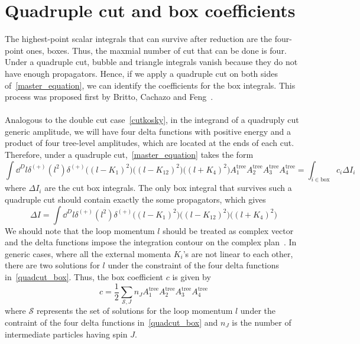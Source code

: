 \section{Quadruple cut and box coefficients}
The highest-point scalar integrals that can survive after reduction are the four-point ones, \ie boxes. 
Thus, the maxmial number of cut that can be done is four. 
Under a quadruple cut, bubble and triangle integrals vanish because they do not have enough propagators.
Hence, if we apply a quadruple cut on both sides of~\cref{master_equation}, we can identify the coefficients for the box integrals.
This process was proposed first by Britto, Cachazo and Feng~\cite{Britto:2004nc}.
\\\\
Analogous to the double cut case~\cref{cutkosky}, in the integrand of a quadruply cut generic amplitude, we will have four delta functions with positive energy and a product of four tree-level amplitudes, which are located at the ends of each cut. 
Therefore, under a quadruple cut,~\cref{master_equation} takes the form
\begin{equation*}
\int\dd^D l \delta^{(+)}(l^2) \delta^{(+)}\big((l-K_1)^2\big)\big((l-K_{12})^2\big)\big((l+K_4)^2\big)
A_1^{\mathrm{tree}}A_2^{\mathrm{tree}}A_3^{\mathrm{tree}}A_4^{\mathrm{tree}}=
\int_{i\in\mathrm{box}} c_i \Delta I_i
\end{equation*}
where $\Delta I_i$ are the cut box integrals.
The only box integral that survives such a quadruple cut should contain exactly the some propagators, which gives
\begin{equation}\label{quadcut_box}
\Delta I = \int \dd^D l \delta^{(+)}(l^2) \delta^{(+)}\big((l-K_1)^2\big)\big((l-K_{12})^2\big)\big((l+K_4)^2\big)
\end{equation}
We should note that the loop momentum $l$ should be treated as complex vector and the delta functions impose the integration contour on the complex plan~\cite{PhysRevD.75.025028, Kosower:2011ty}.
In generic cases, where all the external momenta $K_i$'s are not linear to each other, 
there are two solutions for $l$ under the constraint of the four delta functions in~\cref{quadcut_box}. 
Thus, the box coefficient $c$ is given by
\begin{equation}\label{box_coeff}
c = \frac{1}{2}\sum_{\mathcal{S}, J}n_J A_1^{\mathrm{tree}}A_2^{\mathrm{tree}}A_3^{\mathrm{tree}}A_4^{\mathrm{tree}}
\end{equation}
where $\mathcal{S}$ represents the set of solutions for the loop momentum $l$ under the contraint of the four delta functions in~\cref{quadcut_box} and $n_J$ is the number of intermediate particles having spin $J$.
